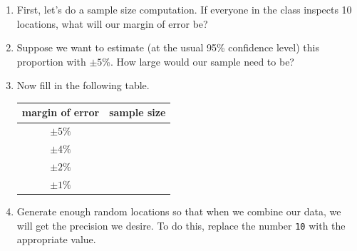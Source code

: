 \begin{enumerate}
\item
First, let's do a sample size computation.  
If everyone in the class inspects 10 locations, what will our margin of error be?
\vspace{1in}
\vfill

\item
Suppose we want to estimate (at the usual 95\% confidence level) 
this proportion with $\pm 5$\%.  How large would our sample need to be?


\vspace{2in}

\item
Now fill in the following table.

\begin{center}
\large
\begin{tabular}{c|c}
\hline
margin of error & sample size \\
\hline
\hline
$\pm 5\%$ & \\[3mm]
$\pm 4\%$ & \\[3mm]
$\pm 2\%$ & \\[3mm]
$\pm 1\%$ & \\
\hline
\end{tabular}
\end{center}


\newpage
\item Generate enough random locations so that when we combine 
our data, we will get the precision we desire.  To do this, replace
the number \verb!10! with the appropriate value.

\begin{knitrout}
\end{knitrout}



\end{enumerate}
